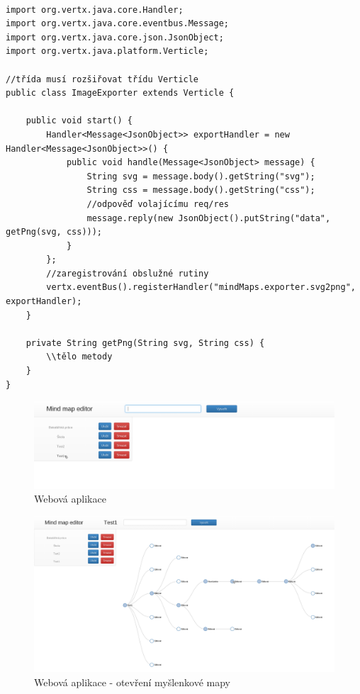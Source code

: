 \begin{lstlisting}[caption=Verticle v jazyce Java]

import org.vertx.java.core.Handler;
import org.vertx.java.core.eventbus.Message;
import org.vertx.java.core.json.JsonObject;
import org.vertx.java.platform.Verticle;

//třída musí rozšiřovat třídu Verticle
public class ImageExporter extends Verticle {
	
	public void start() {
		Handler<Message<JsonObject>> exportHandler = new Handler<Message<JsonObject>>() {
			public void handle(Message<JsonObject> message) {
				String svg = message.body().getString("svg");
				String css = message.body().getString("css");
				//odpověď volajícímu req/res
				message.reply(new JsonObject().putString("data", getPng(svg, css)));
			}
		};
		//zaregistrování obslužné rutiny
		vertx.eventBus().registerHandler("mindMaps.exporter.svg2png", exportHandler);
	}

	private String getPng(String svg, String css) { 
		\\tělo metody
	}
}
\end{lstlisting}

\begin{figure}
\begin{centering}
\includegraphics[width	=1\textwidth]{obrazky/mindmap1}
\par\end{centering}
\caption{Webová aplikace\label{fig:midnmap1}}
\end{figure}

\begin{figure}
\begin{centering}
\includegraphics[width	=1\textwidth]{obrazky/mindmap2}
\par\end{centering}
\caption{Webová aplikace - otevření myšlenkové mapy\label{fig:midnmap2}}
\end{figure}

